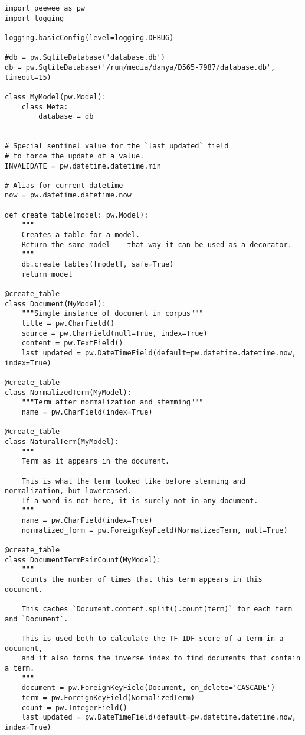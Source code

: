 \documentclass[a4page]{article}
\begin{document}
\begin{verbatim}
import peewee as pw
import logging

logging.basicConfig(level=logging.DEBUG)

#db = pw.SqliteDatabase('database.db')
db = pw.SqliteDatabase('/run/media/danya/D565-7987/database.db', timeout=15)

class MyModel(pw.Model):
    class Meta:
        database = db


# Special sentinel value for the `last_updated` field
# to force the update of a value.
INVALIDATE = pw.datetime.datetime.min

# Alias for current datetime
now = pw.datetime.datetime.now

def create_table(model: pw.Model):
    """
    Creates a table for a model.
    Return the same model -- that way it can be used as a decorator.
    """
    db.create_tables([model], safe=True)
    return model

@create_table
class Document(MyModel):
    """Single instance of document in corpus"""
    title = pw.CharField()
    source = pw.CharField(null=True, index=True)
    content = pw.TextField()
    last_updated = pw.DateTimeField(default=pw.datetime.datetime.now, index=True)

@create_table
class NormalizedTerm(MyModel):
    """Term after normalization and stemming"""
    name = pw.CharField(index=True)

@create_table
class NaturalTerm(MyModel):
    """
    Term as it appears in the document.
    
    This is what the term looked like before stemming and normalization, but lowercased.
    If a word is not here, it is surely not in any document.
    """
    name = pw.CharField(index=True)
    normalized_form = pw.ForeignKeyField(NormalizedTerm, null=True)

@create_table
class DocumentTermPairCount(MyModel):
    """
    Counts the number of times that this term appears in this document.
    
    This caches `Document.content.split().count(term)` for each term and `Document`.

    This is used both to calculate the TF-IDF score of a term in a document,
    and it also forms the inverse index to find documents that contain a term.
    """
    document = pw.ForeignKeyField(Document, on_delete='CASCADE')
    term = pw.ForeignKeyField(NormalizedTerm)
    count = pw.IntegerField()
    last_updated = pw.DateTimeField(default=pw.datetime.datetime.now, index=True)


\end{verbatim}
\end{document}
